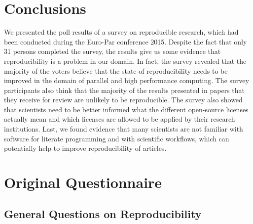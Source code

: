 \documentclass{article}\usepackage[]{graphicx}\usepackage[]{color}
\newcommand{\europar}{Euro-Par\xspace}
\begin{document}
\section{Conclusions}
\label{sec:conclusions}

We presented the poll results of a survey on reproducible research,
which had been conducted during the \europar conference 2015. Despite
the fact that only 31 persons completed the survey, the results give
us some evidence that reproducibility is a problem in our domain. In
fact, the survey revealed that the majority of the voters believe that
the state of reproducibility needs to be improved in the domain of
parallel and high performance computing. The survey participants also
think that the majority of the results presented in papers that they
receive for review are unlikely to be reproducible. The survey also
showed that scientists need to be better informed what the different
open-source licenses actually mean and which licenses are allowed to
be applied by their research institutions.  Last, we found evidence
that many scientists are not familiar with software for literate
programming and with scientific workflows, which can potentially help
to improve reproducibility of articles.





\newpage


\appendix

\section{Original Questionnaire}
\label{sec:questionnaire}

\subsection{General Questions on Reproducibility}
\label{sec-1}
\end{document}

